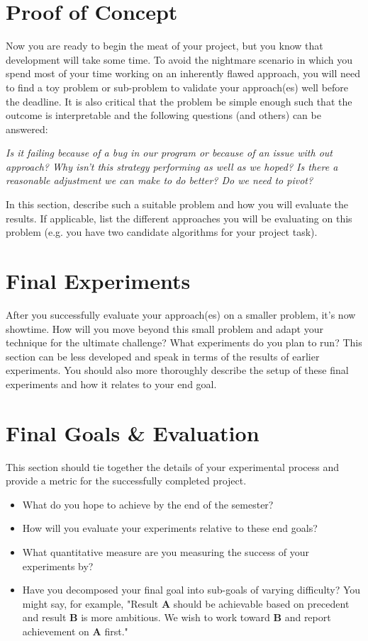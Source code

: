 \section{Proof of Concept}
Now you are ready to begin the meat of your project, but you know that development will take some time. To avoid the nightmare scenario in which you spend most of your time working on an inherently flawed approach, you will need to find a toy problem or sub-problem to validate your approach(es) well before the deadline. It is also critical that the problem be simple enough such that the outcome is interpretable and the following questions (and others) can be answered:

\textit{Is it failing because of a bug in our program or because of an issue with out approach? Why isn't this strategy performing as well as we hoped? Is there a reasonable adjustment we can make to do better? Do we need to pivot?}

In this section, describe such a suitable problem and how you will evaluate the results. If applicable, list the different approaches you will be evaluating on this problem (e.g. you have two candidate algorithms for your project task).

\section{Final Experiments}

After you successfully evaluate your approach(es) on a smaller problem, it's now showtime. How will you move beyond this small problem and adapt your technique for the ultimate challenge? What experiments do you plan to run? This section can be less developed and speak in terms of the results of earlier experiments. You should also more thoroughly describe the setup of these final experiments and how it relates to your end goal.

\section{Final Goals \& Evaluation}

This section should tie together the details of your experimental process and provide a metric for the successfully completed project.

\begin{itemize}
	\item What do you hope to achieve by the end of the semester?
	\item How will you evaluate your experiments relative to these end goals?
	\item What quantitative measure are you measuring the success of your experiments by?
	\item Have you decomposed your final goal into sub-goals of varying difficulty? You might say, for example, "Result \textbf{A} should be achievable based on precedent and result \textbf{B} is more ambitious. We wish to work toward \textbf{B} and report achievement on \textbf{A} first."
\end{itemize}

